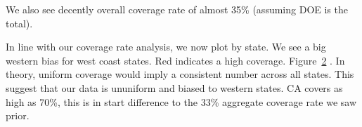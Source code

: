 \documentclass[
  12pt]{article}
\begin{document}
We also see decently overall coverage rate of almost 35\% (assuming DOE
is the total).

\begin{figure}


\caption{\label{fig-coverage_pie}}

\end{figure}%

In line with our coverage rate analysis, we now plot by state. We see a
big western bias for west coast states. Red indicates a high coverage.
Figure~\ref{fig-map} . In theory, uniform coverage would imply a
consistent number across all states. This suggest that our data is
ununiform and biased to western states. CA covers as high as 70\%, this
is in start difference to the 33\% aggregate coverage rate we saw prior.

\begin{figure}


\caption{\label{fig-map}}

\end{figure}%
\end{document}
